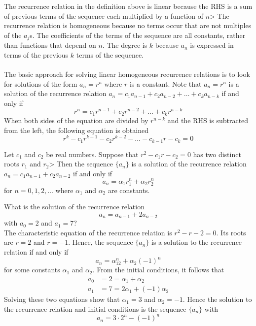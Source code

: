 \documentclass[12pt]{article}
\begin{document}
The recurrence relation in the definition above is linear because the RHS is a sum of previous terms of the sequence each multiplied by a function of $n$> The recurrence relation is homogeneous because no terms occur that are not multiples of the $a_j$s. The coefficients of the terms of the sequence are all constants, rather than functions that depend on $n$. The degree is $k$ because $a_n$ is expressed in terms of the previous $k$ terms of the sequence. \\~\\ 
The basic approach for solving linear homogeneous recurrence relations is to look for solutions of the form $a_n = r^n$ where $r$ is a constant. Note that $a_n = r^n$ is a solution of the recurrence relation $a_n = c_1a_{n - 1} + c_2a_{n - 2} + \dots + c_ka_{n - k} $ if and only if $$r^n = c_1r^{n - 1} + c_2r^{n - 2} + \dots + c_kr^{n - k} $$ When both sides of the equation are divided by $r^{n - k}$ and the RHS is subtracted from the left, the following equation is obtained $$r^k - c_1r^{k - 1} - c_2r^{k - 2} - \dots - c_{k - 1}r - c_k = 0 $$ 
\begin{theorem} Let $c_1$ and $c_2$ be real numbers. Suppose that $r^2 - c_1r - c_2 = 0$ has two distinct roots $r_1$ and $r_2$>  Then the sequence $\{a_n\}$ is a solution of the recurrence relation $a_n = c_1a_{n - 1} + c_2a_{n - 2}$ if and only if $$a_n = \alpha_1r_1^n + \alpha_2r_2^n$$ for $n = 0, 1, 2, \dots$ where $\alpha_1$ and $\alpha_2$ are constants. \end{theorem}

\begin{example} What is the solution of the recurrence relation $$a_n = a_{n - 1} + 2a_{n - 2} $$ with $a_0 = 2$ and $a_1 = 7$? \\ The characteristic equation of the recurrence relation is $r^2 - r - 2 = 0$. Its roots are $r = 2$ and $r = -1$. Hence, the sequence $\{a_n\}$ is a solution to the recurrence relation if and only if $$a_n = \alpha_12^n + \alpha_2(-1)^n $$ for some constants $\alpha_1$ and $\alpha_2$. From the initial conditions, it follows that $$\begin{aligned} a_0 &= 2 = \alpha_1 + \alpha_2 \\ a_1 &= 7 = 2\alpha_1 + (-1)\alpha_2 \end{aligned} $$ Solving these two equations show that $\alpha_1 = 3$ and $\alpha_2 = -1$. Hence the solution to the recurrence relation and initial conditions is the sequence $\{a_n\}$ with $$a_n = 3\cdot 2^n - (-1)^n $$ \end{example} 
\end{document}
